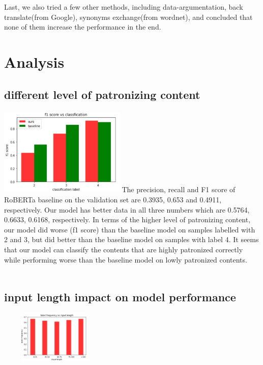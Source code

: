 \documentclass[11pt,a4paper]{article}
\begin{document}
Last, we also tried a few other methods, including data-argumentation, back translate(from Google), synonyms exchange(from wordnet), and concluded that none of them increase the performance in the end.
\section{Analysis}
\subsection{different level of patronizing content}
\includegraphics[width=0.45\textwidth, height=120pt]{figures/f1scorevslabel.png}
 The precision, recall and F1 score of RoBERTa baseline on the validation set are 0.3935, 0.653 and 0.4911, respectively. Our model has better data in all three numbers which are 0.5764, 0.6633, 0.6168, respectively. In terms of the higher level of patronizing content, our model did worse (f1 score) than the baseline model on samples labelled with 2 and 3, but did better than the baseline model on samples with label 4. It seems that our model can classify the contents that are highly patronized correctly while performing worse than the baseline model on lowly patronized contents.
\\\\
\subsection{input length impact on model performance}
\includegraphics[width=0.4\textwidth, height=70pt]{figures/inputle.png}
\end{document}
